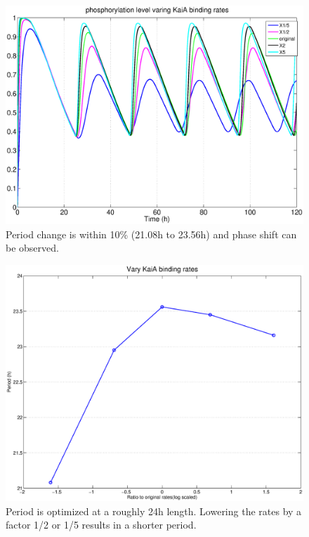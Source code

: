 \documentclass[a4paper,10pt]{article}
\numberwithin{equation}{section}
\begin{document}
\begin{figure}[H]
\centering
\includegraphics[scale=0.45]{tempcomp2.eps}
\caption{\selectfont Period change is within 10\% (21.08h to 23.56h) and phase shift can be observed.}\label{fig:varya}
\end{figure}

\begin{figure}[H]
\centering
\includegraphics[scale=0.4]{tempcomp6.eps}
\caption{\selectfont Period is optimized at a roughly 24h length. Lowering the rates by a factor 1/2 or 1/5 results in a shorter period.}\label{fig:temcompelmt}
\end{figure}
\end{document}

